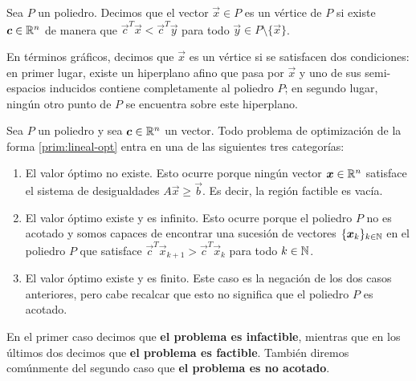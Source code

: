 \begin{definition}
	Sea $P$ un poliedro. Decimos que el vector $\vec{x} \in P$ es un vértice de $P$ si existe
	$\boldsymbol{c} \in \mathbb{R}^n$ de manera que $\vec{c}^T\vec{x} < \vec{c}^T\vec{y}$ para todo $\vec{y} \in P
	\setminus \lbrace \vec{x} \rbrace$.
\end{definition}
En términos gráficos, decimos que $\vec{x}$ es un vértice si se satisfacen dos condiciones: en
primer lugar, existe un hiperplano afino que pasa por $\vec{x}$ y uno de sus semi-espacios inducidos
contiene completamente al poliedro $P$; en segundo lugar, ningún otro punto de $P$ se encuentra
sobre este hiperplano.

\begin{definition}
Sea $P$ un poliedro y sea $\boldsymbol{c} \in \mathbb{R}^n$ un vector. Todo problema de optimización de la forma
\eqref{prim:lineal-opt} entra en una de las siguientes tres categorías:
\begin{enumerate}
	\item El valor óptimo no existe. Esto ocurre porque ningún vector $\boldsymbol{x} \in \mathbb{R}^n$ satisface
		el sistema de desigualdades $A\vec{x} \geq \vec{b}$. Es decir, la región factible es vacía.
	\item El valor óptimo existe y es infinito. Esto ocurre porque el poliedro $P$ no es acotado y
		somos capaces de encontrar una sucesión de vectores $\lbrace \boldsymbol{x}_k \rbrace_{k \in \mathbb{N}}$
		en el poliedro $P$ que satisface $\vec{c}^T\vec{x}_{k+1} > \vec{c}^T\vec{x}_k$ para todo $k \in \mathbb{N}$.
	\item El valor óptimo existe y es finito. Este caso es la negación de los dos casos anteriores,
		pero cabe recalcar que esto no significa que el poliedro $P$ es acotado.
\end{enumerate}
En el primer caso decimos que \textbf{el problema es infactible}, mientras que en los últimos dos
decimos que \textbf{el problema es factible}. También diremos comúnmente del segundo caso que
\textbf{el problema es no acotado}.
\end{definition}

